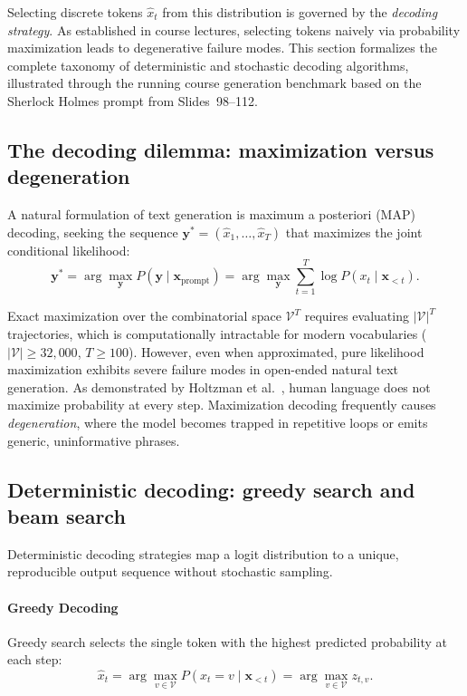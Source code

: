 \documentclass[../../../main.tex]{subfiles}
\begin{document}
Selecting discrete tokens $\hat{x}_t$ from this distribution is governed by the \emph{decoding strategy}. As established in course lectures, selecting tokens naively via probability maximization leads to degenerative failure modes. This section formalizes the complete taxonomy of deterministic and stochastic decoding algorithms, illustrated through the running course generation benchmark based on the Sherlock Holmes prompt from Slides~98--112.


\subsection{The decoding dilemma: maximization versus degeneration}
\label{subsec:decoding_dilemma}

A natural formulation of text generation is maximum a posteriori (MAP) decoding, seeking the sequence $\mathbf{y}^* = (\hat{x}_1, \dots, \hat{x}_T)$ that maximizes the joint conditional likelihood:
\begin{equation}
\mathbf{y}^* = \arg\max_{\mathbf{y}} P(\mathbf{y} \mid \mathbf{x}_{\text{prompt}}) = \arg\max_{\mathbf{y}} \sum_{t=1}^T \log P(x_t \mid \mathbf{x}_{<t}).
\label{eq:map_decoding_objective}
\end{equation}

Exact maximization over the combinatorial space $\mathcal{V}^T$ requires evaluating $|\mathcal{V}|^T$ trajectories, which is computationally intractable for modern vocabularies ($|\mathcal{V}| \ge 32,000$, $T \ge 100$). However, even when approximated, pure likelihood maximization exhibits severe failure modes in open-ended natural text generation. As demonstrated by Holtzman et al.~\cite{holtzman2020}, human language does not maximize probability at every step. Maximization decoding frequently causes \emph{degeneration}, where the model becomes trapped in repetitive loops or emits generic, uninformative phrases.


\subsection{Deterministic decoding: greedy search and beam search}
\label{subsec:deterministic_decoding}

Deterministic decoding strategies map a logit distribution to a unique, reproducible output sequence without stochastic sampling.

\paragraph{Greedy Decoding}
Greedy search selects the single token with the highest predicted probability at each step:
\begin{equation}
\hat{x}_t = \arg\max_{v \in \mathcal{V}} P(x_t = v \mid \mathbf{x}_{<t}) = \arg\max_{v \in \mathcal{V}} z_{t,v}.
\label{eq:greedy_selection}
\end{equation}
\end{document}
